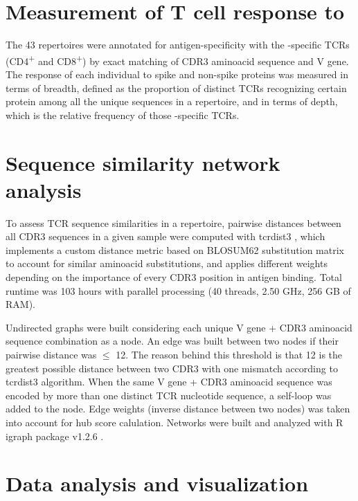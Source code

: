 \section*{Measurement of T cell response to \covid}


The 43 \TCRB{} repertoires were annotated for antigen-specificity with the \covid-specific TCRs (CD4\textsuperscript{+} and CD8\textsuperscript{+}) by exact matching of CDR3 aminoacid sequence and V gene. The \covid{} response of each individual to spike and non-spike proteins was measured in terms of breadth, defined as the proportion of distinct TCRs recognizing certain protein among all the unique sequences in a repertoire, and in terms of depth, which is the relative frequency of those \covid-specific TCRs.



\section*{Sequence similarity network analysis}


To assess TCR sequence similarities in a repertoire, pairwise distances between all CDR3 sequences in a given sample were computed with tcrdist3 \citep{metaclonotypes, tcrdist}, which implements a custom distance metric based on BLOSUM62 substitution matrix to account for similar aminoacid substitutions, and applies different weights depending on the importance of every CDR3 position in antigen binding. Total runtime was 103 hours with parallel processing (40 threads, 2.50 GHz, 256 GB of RAM).

Undirected graphs were built considering each unique V gene + CDR3 aminoacid sequence combination as a node. An edge was built between two nodes if their pairwise distance was $\leq$ 12. The reason behind this threshold is that 12 is the greatest possible distance between two CDR3 with one mismatch according to tcrdist3 algorithm. When the same V gene + CDR3 aminoacid sequence was encoded by more than one distinct TCR nucleotide sequence, a self-loop was added to the node. Edge weights (inverse distance between two nodes) was taken into account for hub score calulation. Networks were built and analyzed with R igraph package v1.2.6 \citep{igraph}.

\section*{Data analysis and visualization}


